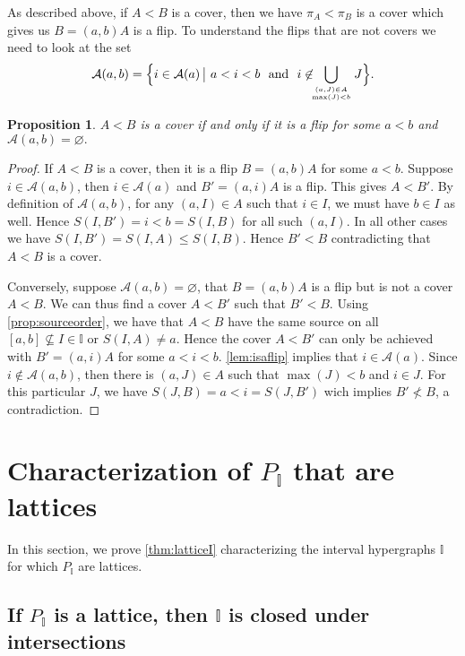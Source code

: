 \documentclass[reqno]{amsart}
\newtheorem{proposition}[theorem]{Proposition}
\theoremstyle{definition}
\newcommand{\II}{\mathbb I} %
\newcommand{\cA}{\mathcal A} %
\begin{document}
As described above, if $A<B$ is a cover, then we have $\pi_A<\pi_B$ is a cover which gives us $B=(a,b)A$ is a  flip.
To understand the flips that are not covers we need to look at the set
 \[
 \cA(a,b)= \Big\{ i\in \cA (a) \,\big|\  a<i<b\  \text { and }\  i\not\in \!\!\!\bigcup_{(a,J)\in A \atop \max(J)<b} J \Big\}.
 \]
 
\begin{proposition} \label{prop:segcover}
$A<B$  is a cover if and only if it is a flip for some $a<b$ and $ \cA(a,b)=\varnothing .$
\end{proposition}

\begin{proof}
If $A<B$  is a cover, then it is a flip $B=(a,b)A$ for some $a<b$.
Suppose $i\in  \cA(a,b)$, then $i\in \cA(a)$ and $B'=(a,i)A$ is a flip.
This gives $A<B'$.
By definition of $\cA(a,b)$, for any $(a,I)\in A$ such that $i\in I$, we must have $b\in I$ as well.
Hence $S(I,B')=i<b=S(I,B)$ for all such $(a,I)$.
In all other cases we have $S(I,B')=S(I,A)\le S(I,B)$.
Hence $B'<B$ contradicting that $A<B$ is a cover.

Conversely, suppose $ \cA(a,b)=\varnothing $, that $B=(a,b)A$ is a flip but  is not a cover $A<B$.
We can thus find a cover $A<B'$ such that $B'<B$.
Using \cref{prop:sourceorder}, we have that $A<B$ have the same source on all $[a,b]\not\subseteq I\in \II$ or $S(I,A)\ne a$.
Hence the cover $A<B'$ can only be achieved with $B'=(a,i)A$ for some $a<i<b$.
\cref{lem:isaflip} implies that $i\in \cA(a)$.
Since $i\not\in \cA(a,b)$, then there is $(a,J)\in A$ such that $\max(J)<b$ and $i\in J$.
For this particular $J$, we have $S(J,B) = a < i = S(J,B')$
wich implies $B'\not < B$, a contradiction.
\end{proof}


\section{Characterization of  $P_\II$ that are lattices}
\label{sec:LatticePI}

In this section, we  prove  \cref{thm:latticeI} characterizing the interval hypergraphs $\II$ for which $P_\II$ are lattices.


\subsection{If $P_\II$ is a lattice, then $\II$ is closed under intersections}  
\label{subsec:latticeI}
\end{document}
